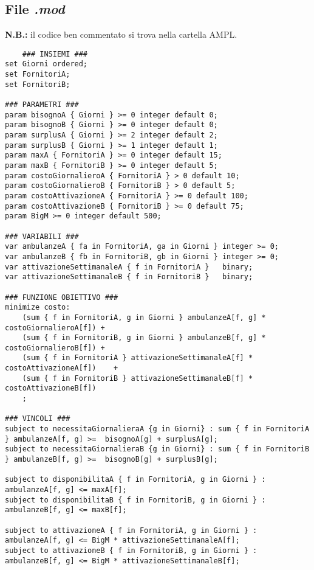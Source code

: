 \subsection{File \textit{.mod}}
\textbf{N.B.:} il codice ben commentato si trova nella cartella AMPL.
\begin{lstlisting}
    ### INSIEMI ###
set Giorni ordered;
set FornitoriA;
set FornitoriB;

### PARAMETRI ###
param bisognoA { Giorni } >= 0 integer default 0;
param bisognoB { Giorni } >= 0 integer default 0;
param surplusA { Giorni } >= 2 integer default 2;
param surplusB { Giorni } >= 1 integer default 1;
param maxA { FornitoriA } >= 0 integer default 15;
param maxB { FornitoriB } >= 0 integer default 5;
param costoGiornalieroA { FornitoriA } > 0 default 10;
param costoGiornalieroB { FornitoriB } > 0 default 5;
param costoAttivazioneA { FornitoriA } >= 0 default 100;
param costoAttivazioneB { FornitoriB } >= 0 default 75;
param BigM >= 0 integer default 500;

### VARIABILI ###
var ambulanzeA { fa in FornitoriA, ga in Giorni } integer >= 0; 
var ambulanzeB { fb in FornitoriB, gb in Giorni } integer >= 0;
var attivazioneSettimanaleA { f in FornitoriA }   binary;
var attivazioneSettimanaleB { f in FornitoriB }	  binary;

### FUNZIONE OBIETTIVO ###
minimize costo: 
    (sum { f in FornitoriA, g in Giorni } ambulanzeA[f, g] * costoGiornalieroA[f]) +
    (sum { f in FornitoriB, g in Giorni } ambulanzeB[f, g] * costoGiornalieroB[f]) +
    (sum { f in FornitoriA } attivazioneSettimanaleA[f] * costoAttivazioneA[f])	   +
    (sum { f in FornitoriB } attivazioneSettimanaleB[f] * costoAttivazioneB[f])
    ;

### VINCOLI ###
subject to necessitaGiornalieraA {g in Giorni} : sum { f in FornitoriA } ambulanzeA[f, g] >=  bisognoA[g] + surplusA[g];
subject to necessitaGiornalieraB {g in Giorni} : sum { f in FornitoriB } ambulanzeB[f, g] >=  bisognoB[g] + surplusB[g];

subject to disponibilitaA { f in FornitoriA, g in Giorni } :  ambulanzeA[f, g] <= maxA[f];
subject to disponibilitaB { f in FornitoriB, g in Giorni } :  ambulanzeB[f, g] <= maxB[f]; 

subject to attivazioneA { f in FornitoriA, g in Giorni } : ambulanzeA[f, g] <= BigM * attivazioneSettimanaleA[f];
subject to attivazioneB { f in FornitoriB, g in Giorni } : ambulanzeB[f, g] <= BigM * attivazioneSettimanaleB[f]; 

\end{lstlisting}